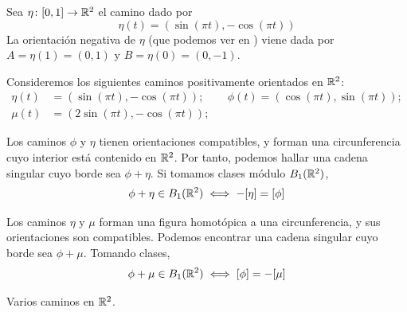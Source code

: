 \begin{example}
Sea $\eta\colon [0,1] \to \mathbb{R}^2$ el camino dado por
\[\eta(t)=(\sin(\pi t),-\cos(\pi t))\]
La orientación negativa de $\eta$ (que podemos ver en
) viene dada por $A=\eta(1)=(0,1)$ y $B=\eta(0)=(0,-1)$.
\end{example}


Consideremos los siguientes caminos positivamente orientados en $\mathbb{R}^2$:
\begin{align*}
\eta(t)	&=(\sin(\pi t),-\cos(\pi t)); &&\phi(t)=(\cos(\pi t),\sin(\pi t));\\
\mu(t)	&=(2\sin(\pi t),-\cos(\pi t));
\end{align*}

Los caminos $\phi$ y $\eta$ tienen orientaciones compatibles, y forman una
circunferencia cuyo interior está contenido en $\mathbb{R}^2$. Por tanto, podemos
hallar una cadena singular cuyo borde sea $\phi+\eta$. Si tomamos clases módulo
$B_1(\mathbb{R}^2)$,
\[\phi+\eta \in B_1(\mathbb{R}^2) \iff -[\eta]=[\phi]\]

Los caminos $\eta$ y $\mu$ forman una figura homotópica a una circunferencia, y
sus orientaciones son compatibles. Podemos encontrar una cadena singular cuyo
borde sea $\phi+\mu$. Tomando clases,
\[\phi+\mu \in B_1(\mathbb{R}^2) \iff [\phi]=-[\mu]\]

\begin{marginfigure}
\caption{Varios caminos en $\mathbb{R}^2$.}
\end{marginfigure}

